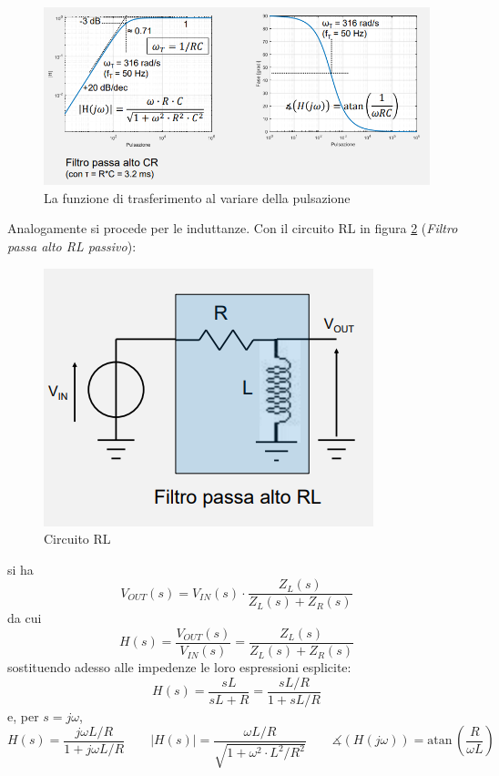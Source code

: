 \documentclass{article}
\begin{document}
\begin{figure}[h]
  \centering
  \includegraphics[scale=0.7]{IM_circuito_CR_passivo_grafici}
  \caption{La funzione di trasferimento al variare della pulsazione}
  \label{Schema_circuito_CR_passivo_grafici}
\end{figure}
\clearpage
Analogamente si procede per le induttanze. Con il circuito RL in figura \ref{Schema_circuito_RL_passivo} (\textit{Filtro passa alto RL passivo}):

\begin{figure}[h]
  \centering
  \includegraphics[scale=0.6]{IM_circuito_RL_passivo}
  \caption{Circuito RL}
  \label{Schema_circuito_RL_passivo}
\end{figure}

si ha
\[V_{OUT}(s) = V_{IN}(s) \cdot \frac{Z_L(s)}{Z_L(s) + Z_R(s)}\]
da cui 
\[H(s) = \frac{V_{OUT} (s)}{V_{IN} (s)} = \frac{Z_L(s)}{Z_L(s) + Z_R(s)}\]
sostituendo adesso alle impedenze le loro espressioni esplicite:
\[H(s) = \frac{sL}{sL + R} = \frac{sL/R}{1 + sL/R}\]
e, per $s = j\omega$, 
\[H(s) = \frac{j \omega L/R}{1 + j \omega L/R} \quad \quad |H(s)| = \frac{\omega L/R}{\sqrt{1 + \omega ^2 \cdot L^2 / R^2}} \quad \quad \measuredangle (H(j \omega)) = \textrm{atan}\, \left(\frac{R}{\omega L} \right)\]
\end{document}
